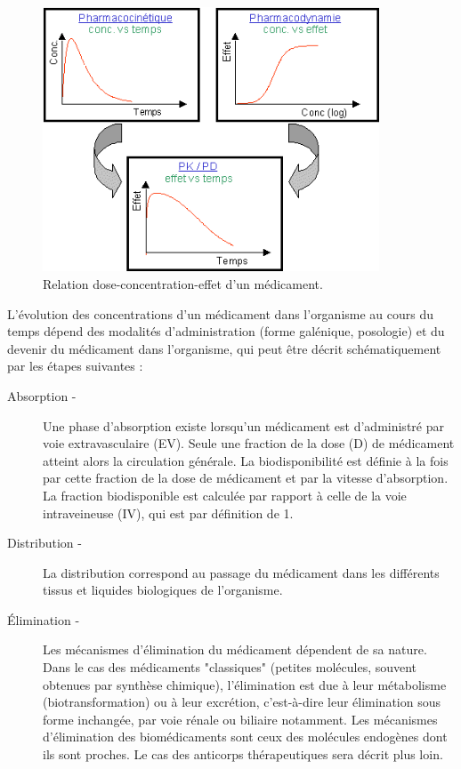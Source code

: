 \begin{figure}[htbp]
	\centering
		\includegraphics[width=10cm]{figures/raster/Figure1_PKPD}
	\caption{Relation dose-concentration-effet d'un médicament.}
	\label{fig:1}
\end{figure}

L'évolution des concentrations d'un médicament dans l'organisme au cours du temps dépend des modalités d'administration (forme galénique, posologie) et du devenir du médicament dans l'organisme, qui peut être décrit schématiquement par les étapes suivantes :
\begin{description}
\item[Absorption -] Une phase d'absorption existe lorsqu'un médicament est d'administré par voie extravasculaire (EV). Seule une fraction de la dose (D) de médicament atteint alors la circulation générale. La biodisponibilité est définie à la fois par cette fraction de la dose de médicament et par la vitesse d'absorption. La fraction biodisponible est calculée par rapport à celle de la voie intraveineuse (IV), qui est par définition de 1.
\item[Distribution -] La distribution correspond au passage du médicament dans les différents tissus et liquides biologiques de l'organisme.
\item[Élimination -] Les mécanismes d'élimination du médicament dépendent de sa nature. Dans le cas des médicaments "classiques" (petites molécules, souvent obtenues par synthèse chimique), l'élimination est due à leur métabolisme (biotransformation) ou à leur excrétion, c'est-à-dire leur élimination sous forme inchangée, par voie rénale ou biliaire notamment. Les mécanismes d'élimination des biomédicaments sont ceux des molécules endogènes dont ils sont proches. Le cas des anticorps thérapeutiques sera décrit plus loin.
\end{description}

